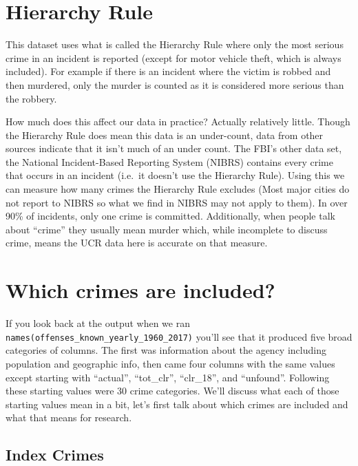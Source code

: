 \documentclass[
  12pt,
  openany]{book}
\begin{document}
\hypertarget{hierarchy-rule}{%
\section{Hierarchy Rule}\label{hierarchy-rule}}

This dataset uses what is called the Hierarchy Rule where only the most serious crime in an incident is reported (except for motor vehicle theft, which is always included). For example if there is an incident where the victim is robbed and then murdered, only the murder is counted as it is considered more serious than the robbery.

How much does this affect our data in practice? Actually relatively little. Though the Hierarchy Rule does mean this data is an under-count, data from other sources indicate that it isn't much of an under count. The FBI's other data set, the National Incident-Based Reporting System (NIBRS) contains every crime that occurs in an incident (i.e.~it doesn't use the Hierarchy Rule). Using this we can measure how many crimes the Hierarchy Rule excludes (Most major cities do not report to NIBRS so what we find in NIBRS may not apply to them). In over 90\% of incidents, only one crime is committed. Additionally, when people talk about ``crime'' they usually mean murder which, while incomplete to discuss crime, means the UCR data here is accurate on that measure.

\hypertarget{which-crimes-are-included}{%
\section{Which crimes are included?}\label{which-crimes-are-included}}

If you look back at the output when we ran \texttt{names(offenses\_known\_yearly\_1960\_2017)} you'll see that it produced five broad categories of columns. The first was information about the agency including population and geographic info, then came four columns with the same values except starting with ``actual'', ``tot\_clr'', ``clr\_18'', and ``unfound''. Following these starting values were 30 crime categories. We'll discuss what each of those starting values mean in a bit, let's first talk about which crimes are included and what that means for research.

\hypertarget{index-crimes-1}{%
\subsection{Index Crimes}\label{index-crimes-1}}
\end{document}
